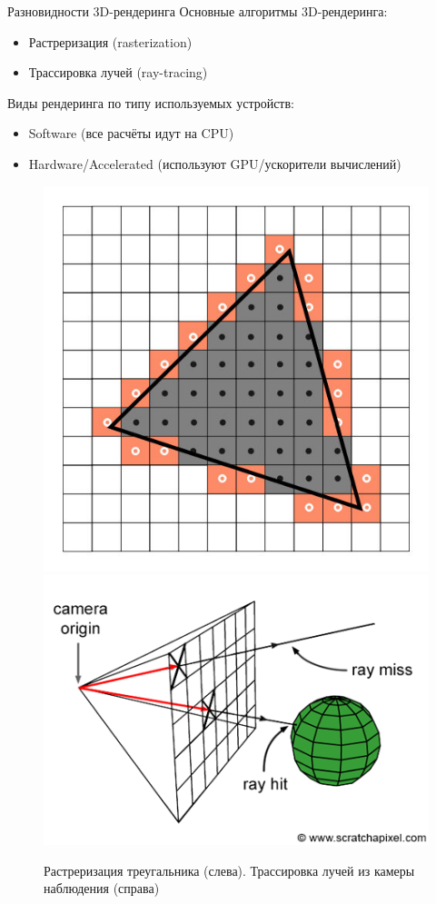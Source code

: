 \documentclass{beamer}
\begin{document}
\begin{frame}{Разновидности 3D-рендеринга}
Основные алгоритмы 3D-рендеринга:
\begin{itemize}
    \item Растреризация (rasterization)
    \item Трассировка лучей (ray-tracing)
\end{itemize}

Виды рендеринга по типу используемых устройств:
\begin{itemize}
    \item Software (все расчёты идут на CPU)
    \item Hardware/Accelerated (используют GPU/ускорители вычислений)
\end{itemize}

\begin{figure}
\centering
\includegraphics[height=0.30\textwidth]{rasterization.jpg}
\includegraphics[height=0.30\textwidth]{rt-setup2.png}
\caption{Растреризация треугальника (слева). Трассировка лучей из камеры наблюдения (справа)}
\end{figure}

\end{frame}
\end{document}
